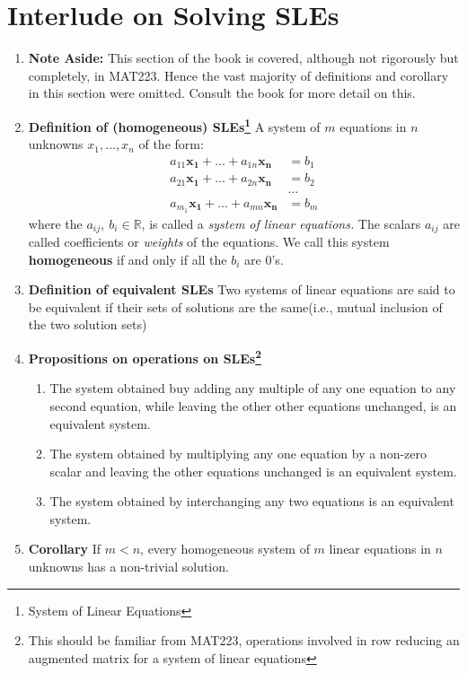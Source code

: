 \documentclass[oneside, 12pt]{book}
\newcommand{\settag}[1]{\renewcommand{\theenumi}{#1}}
\newcommand{\R}{\mathbb{R}}
\newcommand{\tbf}[1]{\textbf{#1}}
\newcommand{\tit}[1]{\textit{#1}}
\begin{document}
\section{Interlude on Solving SLEs}
    \begin{enumerate}
        \settag{1.5.*}
        \item \tbf{Note Aside: }This section of the book is covered, although not rigorously but completely, in MAT223. Hence the vast majority of definitions and corollary in this section were omitted. Consult the book for more detail on this.
        
        \settag{1.5.1}
        \item \tbf{Definition of (homogeneous) SLEs\footnote{System of Linear Equations}} A system of $m$ equations in $n$ unknowns $x_1,\ldots,x_n$ of the form:
        \begin{align*}
            a_{11}\mathbf{x_1}+\ldots+a_{1n}\mathbf{x_n} &= b_1 \\
            a_{21}\mathbf{x_1}+\ldots+a_{2n}\mathbf{x_n} &= b_2 \\
            &\mbox{\ldots} \\
            a_{m_1}\mathbf{x_1}+\ldots+a_{mn}\mathbf{x_n} &= b_m
        \end{align*}
        where the $a_{ij},~b_i\in \R$, is called a \tit{system of linear equations.} The scalars $a_{ij}$ are called coefficients or \tit{weights} of the equations. We call this system \textbf{homogeneous} if and only if all the $b_i$ are 0's.
        
        \settag{1.5.2}
        \item \tbf{Definition of equivalent SLEs} Two systems of linear equations are said to be equivalent if their sets of solutions are the same(i.e., mutual inclusion of the two solution sets)
        
        \settag{1.5.3}
        \item \tbf{Propositions on operations on SLEs\footnote{This should be familiar from MAT223, operations involved in row reducing an augmented matrix for a system of linear equations}}
        \begin{enumerate}
            \item The system obtained buy adding any multiple of any one equation to any second equation, while leaving the other other equations unchanged, is an equivalent system.
            \item The system obtained by multiplying any one equation by a non-zero scalar and leaving the other equations unchanged is an equivalent system.
            \item The system obtained by interchanging any two equations is an equivalent system.
        \end{enumerate}
        
        \settag{1.5.13}
        \item \tbf{Corollary} If $m<n$, every homogeneous system of $m$ linear equations in $n$ unknowns has a non-trivial solution.
    \end{enumerate}
    
\end{document}
